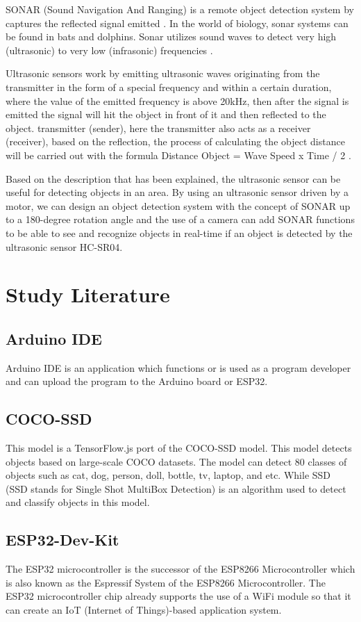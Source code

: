 \documentclass[conference]{IEEEtran}
\begin{document}
SONAR (Sound Navigation And Ranging) is a remote object detection system by captures the reflected signal emitted \cite{b2}. In the world of biology, sonar systems can be found in bats and dolphins. Sonar utilizes sound waves to detect very high (ultrasonic) to very low (infrasonic) frequencies \cite{b2}.

Ultrasonic sensors work by emitting ultrasonic waves originating from the transmitter in the form of a special frequency and within a certain duration, where the value of the emitted frequency is above 20kHz, then after the signal is emitted the signal will hit the object in front of it and then reflected to the object. transmitter (sender), here the transmitter also acts as a receiver (receiver), based on the reflection, the process of calculating the object distance will be carried out with the formula Distance Object = Wave Speed x Time / 2 \cite{b3}.

Based on the description that has been explained, the ultrasonic sensor can be useful for detecting objects in an area. By using an ultrasonic sensor driven by a motor, we can design an object detection system with the concept of SONAR up to a 180-degree rotation angle and the use of a camera can add SONAR functions to be able to see and recognize objects in real-time if an object is detected by the ultrasonic sensor HC-SR04.

\section{Study Literature}
\subsection{Arduino IDE}
Arduino IDE is an application which functions or is used as a program developer and can upload the program to the Arduino board or ESP32\cite{b4}.
\subsection{COCO-SSD}
This model is a TensorFlow.js port of the COCO-SSD model. This model detects objects based on large-scale COCO datasets. The model can detect 80 classes of objects such as cat, dog, person, doll, bottle, tv, laptop, and etc. While SSD (SSD stands for Single Shot MultiBox Detection) is an algorithm used to detect and classify objects in this model\cite{b5}.
\subsection{ESP32-Dev-Kit}
The ESP32 microcontroller is the successor of the ESP8266 Microcontroller which is also known as the Espressif System of the ESP8266 Microcontroller. The ESP32 microcontroller chip already supports the use of a WiFi module so that it can create an IoT (Internet of Things)-based application system\cite{b6}.
\end{document}
